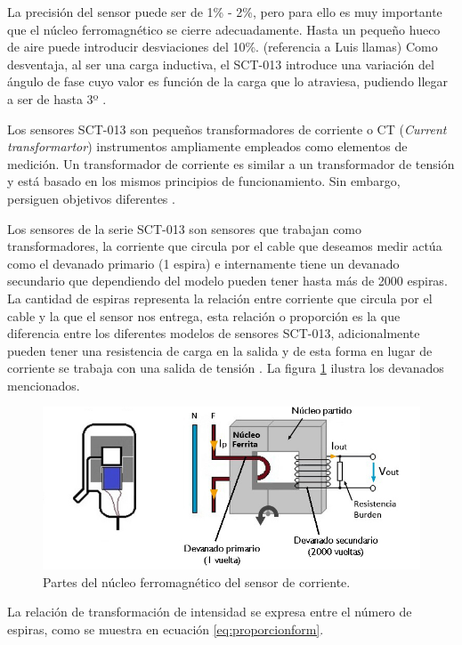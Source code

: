 \begin{enumerate}
La precisión del sensor puede ser de 1\% - 2\%, pero para ello es muy importante que el núcleo ferromagnético se cierre adecuadamente. Hasta un pequeño hueco de aire puede introducir desviaciones del 10\%. (referencia a Luis llamas) Como desventaja, al ser una carga inductiva, el SCT-013 introduce una variación del ángulo de fase cuyo valor es función de la carga que lo atraviesa, pudiendo llegar a ser de hasta 3º \citep{WEBSITE:9}.

Los sensores SCT-013 son pequeños transformadores de corriente o CT (\emph{Current transformartor}) instrumentos ampliamente empleados como elementos de medición. Un transformador de corriente es similar a un transformador de tensión y está basado en los mismos principios de funcionamiento. Sin embargo, persiguen objetivos diferentes \citep{WEBSITE:9}.

Los sensores de la serie SCT-013 son sensores que trabajan como transformadores, la corriente que circula por el cable que deseamos medir actúa como el devanado primario (1 espira) e internamente tiene un devanado secundario que dependiendo del modelo pueden tener hasta más de 2000 espiras. La cantidad de espiras representa la relación entre corriente que circula por el cable y la que el sensor nos entrega, esta relación o proporción es la que diferencia entre los diferentes modelos de sensores SCT-013, adicionalmente pueden tener una resistencia de carga en la salida y de esta forma en lugar de corriente se trabaja con una salida de tensión \citep{WEBSITE:21}. La figura \ref{fig:espiras} ilustra los devanados mencionados.


\begin{figure}[htpb]
\centering 
\includegraphics[width=1.0\textwidth]{./Figures/espiras.jpg}
\caption{Partes del núcleo ferromagnético del sensor de corriente.}
\label{fig:espiras}
\end{figure}

La relación de transformación de intensidad se expresa entre el número de espiras, como se muestra en ecuación \ref{eq:proporcionform}.


\end{enumerate}
